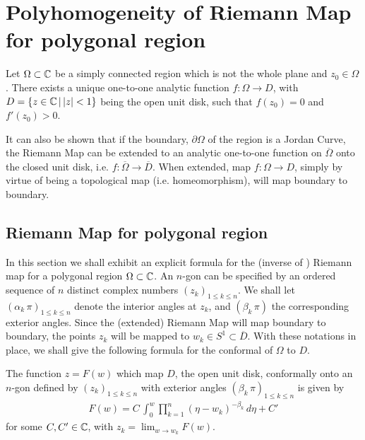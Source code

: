 



\section{Polyhomogeneity of Riemann Map for polygonal region} 

\begin{theorem}
Let $\Omega \subset \mathbb C$ be a simply connected region which is not the whole plane and $z_0 \in \Omega$. There exists a unique one-to-one analytic function $f: \Omega \to D$, with $D = \{z \in \mathbb C \, |\, |z| < 1\}$ being the open unit disk, such that $f(z_0) = 0$ and $f'(z_0) > 0$. 
\end{theorem}

It can also be shown that if the boundary, $\partial \Omega$ of the region is a Jordan Curve, the Riemann Map can be extended to an analytic one-to-one function on $\overline{\Omega}$ onto the closed unit disk, i.e. $f: \overline{\Omega} \to \overline{D}$. When extended, map $f: \Omega \to D$, simply by virtue of being a topological map (i.e. homeomorphism), will map boundary to boundary. 


\subsection{Riemann Map for polygonal region}
In this section we shall exhibit an explicit formula for the (inverse of ) Riemann map for a polygonal region $\Omega \subset \mathbb C$. An $n$-gon can be specified by an ordered sequence of $n$ distinct complex numbers $(z_k)_{1 \leq k \leq n}$. We shall let $(\alpha_k \, \pi)_{1 \leq k \leq n}$ denote the interior angles at $z_k$, and $(\beta_k \, \pi)$ the corresponding exterior angles. Since the (extended) Riemann Map will map boundary to boundary, the points $z_k$ will be mapped to $w_k \in S^1 \subset \overline{D}$. With these notations in place, we shall give the following formula for the conformal of $\Omega$ to $D$. 
\begin{theorem}
The function $ z = F(w)$ which map $D$, the open unit disk, conformally onto an $n$-gon defined by  $(z_k)_{1 \leq k \leq n}$ with exterior angles $(\beta_k \, \pi)_{1 \leq k \leq n}$ is given by 
\begin{align} \label{eq: schwarz-christoffel formula}
F(w) = C \, \int_0^w \prod_{k = 1}^n (\eta - w_k)^{- \beta_k} \, d\eta + C'
\end{align}
for some $C, C' \in \mathbb C$, with $z_k = \lim_{w \to w_k} F(w)$. 
\end{theorem}

